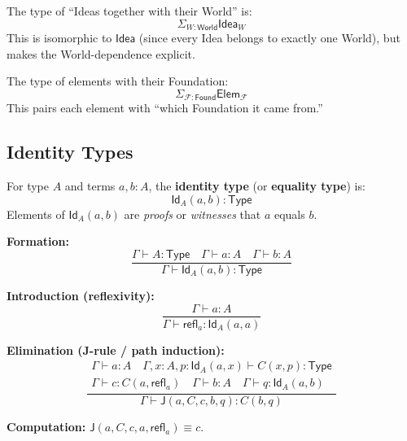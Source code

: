 \begin{example}
\label{ex:typed-ideas}
The type of ``Ideas together with their World'' is:
\[
  \Sigma_{W : \mathsf{World}} \mathsf{Idea}_W
\]
This is isomorphic to $\mathsf{Idea}$ (since every Idea belongs to exactly one World),
but makes the World-dependence explicit.
\end{example}

\begin{example}
\label{ex:foundation-tagged}
The type of elements with their Foundation:
\[
  \Sigma_{\mathcal{F} : \mathsf{Found}} \mathsf{Elem}_{\mathcal{F}}
\]
This pairs each element with ``which Foundation it came from.''
\end{example}

\subsection{Identity Types}
\label{subsec:identity-types}

\begin{definition}
\label{def:identity-type}
For type $A$ and terms $a, b : A$, the \textbf{identity type} (or \textbf{equality type}) is:
\[
  \mathsf{Id}_A(a, b) : \mathsf{Type}
\]
Elements of $\mathsf{Id}_A(a, b)$ are \emph{proofs} or \emph{witnesses} that $a$ equals $b$.
\end{definition}

\begin{definition}
\label{def:identity-type-rules}
\textbf{Formation:}
\[
  \frac{\Gamma \vdash A : \mathsf{Type} \quad \Gamma \vdash a : A \quad \Gamma \vdash b : A}
       {\Gamma \vdash \mathsf{Id}_A(a, b) : \mathsf{Type}}
\]

\textbf{Introduction (reflexivity):}
\[
  \frac{\Gamma \vdash a : A}
       {\Gamma \vdash \mathsf{refl}_a : \mathsf{Id}_A(a, a)}
\]

\textbf{Elimination (J-rule / path induction):}
\[
  \frac{\begin{array}{c}
    \Gamma \vdash a : A \quad
    \Gamma, x : A, p : \mathsf{Id}_A(a, x) \vdash C(x, p) : \mathsf{Type} \\
    \Gamma \vdash c : C(a, \mathsf{refl}_a) \quad
    \Gamma \vdash b : A \quad
    \Gamma \vdash q : \mathsf{Id}_A(a, b)
  \end{array}}
       {\Gamma \vdash \mathsf{J}(a, C, c, b, q) : C(b, q)}
\]

\textbf{Computation:} $\mathsf{J}(a, C, c, a, \mathsf{refl}_a) \equiv c$.
\end{definition}

